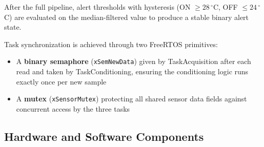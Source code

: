 After the full pipeline, alert thresholds with hysteresis (ON $\geq 28\,^\circ$C,
OFF $\leq 24\,^\circ$C) are evaluated on the median-filtered value to produce a
stable binary alert state.

Task synchronization is achieved through two FreeRTOS primitives:
\begin{itemize}
  \item A \textbf{binary semaphore} (\texttt{xSemNewData}) given by TaskAcquisition
    after each read and taken by TaskConditioning, ensuring the conditioning logic runs
    exactly once per new sample
  \item A \textbf{mutex} (\texttt{xSensorMutex}) protecting all shared sensor data
    fields against concurrent access by the three tasks
\end{itemize}

\subsection{Hardware and Software Components}

